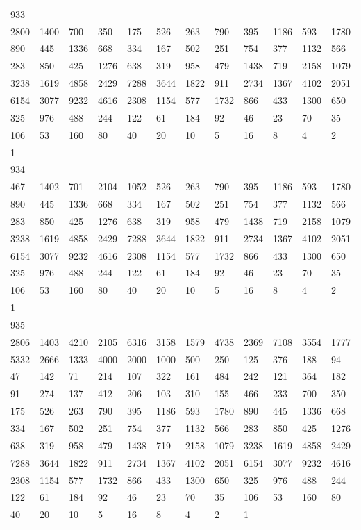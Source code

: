 \begin{longtable}{llllllllllll}
933&&&&&&&&&&&\\
2800& 1400& 700& 350& 175& 526& 263& 790& 395& 1186& 593& 1780\\
890& 445& 1336& 668& 334& 167& 502& 251& 754& 377& 1132& 566\\
283& 850& 425& 1276& 638& 319& 958& 479& 1438& 719& 2158& 1079\\
3238& 1619& 4858& 2429& 7288& 3644& 1822& 911& 2734& 1367& 4102& 2051\\
6154& 3077& 9232& 4616& 2308& 1154& 577& 1732& 866& 433& 1300& 650\\
325& 976& 488& 244& 122& 61& 184& 92& 46& 23& 70& 35\\
106& 53& 160& 80& 40& 20& 10& 5& 16& 8& 4& 2\\
1& \\

934&&&&&&&&&&&\\
467& 1402& 701& 2104& 1052& 526& 263& 790& 395& 1186& 593& 1780\\
890& 445& 1336& 668& 334& 167& 502& 251& 754& 377& 1132& 566\\
283& 850& 425& 1276& 638& 319& 958& 479& 1438& 719& 2158& 1079\\
3238& 1619& 4858& 2429& 7288& 3644& 1822& 911& 2734& 1367& 4102& 2051\\
6154& 3077& 9232& 4616& 2308& 1154& 577& 1732& 866& 433& 1300& 650\\
325& 976& 488& 244& 122& 61& 184& 92& 46& 23& 70& 35\\
106& 53& 160& 80& 40& 20& 10& 5& 16& 8& 4& 2\\
1& \\

935&&&&&&&&&&&\\
2806& 1403& 4210& 2105& 6316& 3158& 1579& 4738& 2369& 7108& 3554& 1777\\
5332& 2666& 1333& 4000& 2000& 1000& 500& 250& 125& 376& 188& 94\\
47& 142& 71& 214& 107& 322& 161& 484& 242& 121& 364& 182\\
91& 274& 137& 412& 206& 103& 310& 155& 466& 233& 700& 350\\
175& 526& 263& 790& 395& 1186& 593& 1780& 890& 445& 1336& 668\\
334& 167& 502& 251& 754& 377& 1132& 566& 283& 850& 425& 1276\\
638& 319& 958& 479& 1438& 719& 2158& 1079& 3238& 1619& 4858& 2429\\
7288& 3644& 1822& 911& 2734& 1367& 4102& 2051& 6154& 3077& 9232& 4616\\
2308& 1154& 577& 1732& 866& 433& 1300& 650& 325& 976& 488& 244\\
122& 61& 184& 92& 46& 23& 70& 35& 106& 53& 160& 80\\
40& 20& 10& 5& 16& 8& 4& 2& 1& \\


\end{longtable}
